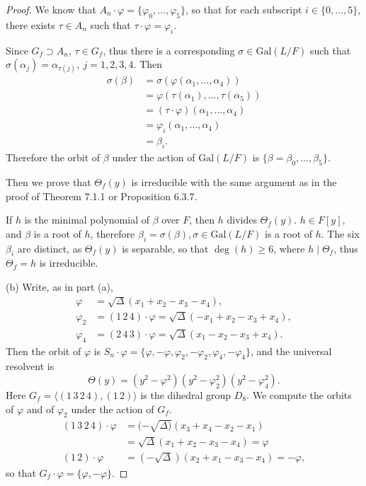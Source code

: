 \documentclass[11pt,a4paper]{article}
\newcommand{\Gal}{\mathrm{Gal}}
\begin{document}
{\begin{proof}
We know that $A_n\cdot \varphi = \{\varphi_0,\ldots,\varphi_5\}$, so that for each subscript $i \in\{0,\ldots,5\}$, there exists $\tau \in A_n$ such that $\tau \cdot \varphi = \varphi_i$. 

Since $G_f \supset A_n$, $\tau \in G_f$, thus there is a corresponding $\sigma \in \Gal(L/F)$ such that $\sigma(\alpha_j) = \alpha_{\tau(j)},\ j = 1,2,3,4$. Then
\begin{align*}
\sigma(\beta) &= \sigma(\varphi(\alpha_1,\ldots,\alpha_4))\\
 &= \varphi(\tau(\alpha_1),\ldots,\tau(\alpha_5))\\
 &= (\tau \cdot \varphi)(\alpha_1,\ldots,\alpha_4) \\
 &= \varphi_i(\alpha_1,\ldots,\alpha_4)\\
 &= \beta_i.
\end{align*}
Therefore the orbit of $\beta$ under the action of $\Gal(L/F)$ is $\{\beta = \beta_0, \ldots, \beta_5\}$.
 
 Then we prove that $\Theta_f(y)$ is irreducible with the same argument as in the proof of Theorem 7.1.1 or Proposition 6.3.7.
 
 If $h$ is the minimal polynomial of $\beta$ over $F$, then $h$ divides $\Theta_f(y)$. $h \in F[y]$, and $\beta$ is a root of $h$, therefore $\beta_i = \sigma(\beta) , \sigma \in \Gal(L/F)$ is a root of $h$. The six $\beta_i$ are distinct, as $\Theta_f(y)$ is separable, so that $\deg(h) \geq 6$, where $h \mid \Theta_f$, thus $\Theta_f = h$ is irreducible.


\item[(b)] Write, as in part (a),
\begin{align*}
\varphi &= \sqrt{\Delta}(x_1+x_2-x_3-x_4),\\
\varphi_2& = (1\,2\,4)\cdot \varphi = \sqrt{\Delta}(-x_1+x_2-x_3+x_4),\\
\varphi_4 & = (2\,4\,3)\cdot \varphi = \sqrt{\Delta}(x_1 -x _2 -x_3 + x_4).
\end{align*}
Then the orbit of $\varphi$ is $S_n\cdot \varphi = \{\varphi, -\varphi, \varphi_2, -\varphi_2, \varphi_4,-\varphi_4\}$, and the universal resolvent is
$$\Theta(y) = (y^2 - \varphi^2)(y^2 - \varphi_2^2)(y^2-\varphi_4^2).$$
Here $G_f =\langle (1\,3\,2\,4),(1\, 2)\rangle$ is the dihedral group $D_8$. We compute the orbits of $\varphi$ and of $\varphi_2$ under the action of $G_f$.
\begin{align*}
(1\,3\,2\,4) \cdot \varphi &= (-\sqrt{\Delta)}(x_3+x_4 -x_2 -x_1)\\
&=\sqrt{\Delta}(x_1+x_2-x_3 -x_4) = \varphi\\
(1\,2)\cdot \varphi &= (-\sqrt{\Delta})(x_2 + x_1 -x_3 -x_4) = -\varphi,
\end{align*}
so that $G_f\cdot \varphi = \{\varphi, -\varphi\}$.


\end{proof}}
\end{document}
